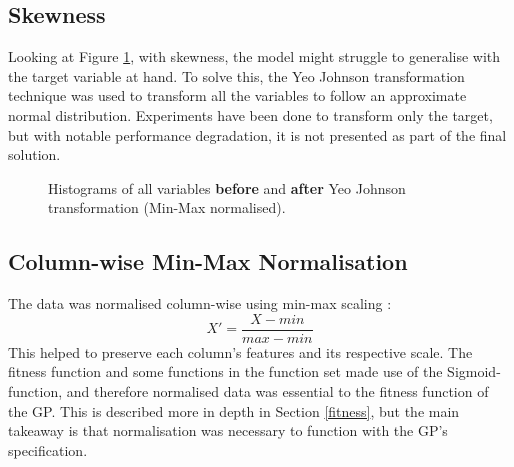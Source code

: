\documentclass{article}
\begin{document}
\subsection{Skewness}
Looking at Figure \ref{targetPost}, with skewness, the model might struggle to generalise with the target variable at hand. To solve this, the Yeo Johnson transformation technique \cite{yeo2000new} was used to transform all the variables to follow an approximate normal distribution. Experiments have been done to transform only the target, but with notable performance degradation, it is not presented as part of the final solution.

\begin{figure}[H]
  \caption{Histograms of all variables \textbf{before} and \textbf{after} Yeo Johnson transformation (Min-Max normalised).}
  \label{targetPost}
\end{figure}

\subsection{Column-wise Min-Max Normalisation}
The data was normalised column-wise using min-max scaling \cite{patro_2015_normalization}:
\begin{equation}\label{norm}
  X' = \frac{X-min}{max-min}
\end{equation}
This helped to preserve each column's features and its respective scale. The fitness function and some functions in the function set made use of the Sigmoid-function, and therefore normalised data was essential to the fitness function of the GP. This is described more in depth in Section \ref{fitness}, but the main takeaway is that normalisation was necessary to function with the GP's specification.
\end{document}
